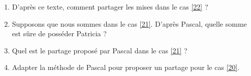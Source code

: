 \documentclass{article}
\begin{document}
\begin{enumerate}[label=\textbf{Question \arabic*}\hfill]
\item D'après ce texte, comment partager les mises dans le cas \ref{22} ?
\item Supposons que nous sommes dans le cas \ref{21}. D'après Pascal, quelle somme est \og sûre \fg de posséder Patricia ?
\item Quel est le partage proposé par Pascal dans le cas \ref{21} ?
\item Adapter la méthode de Pascal pour proposer un partage pour le cas \ref{20}.
\end{enumerate}
\end{document}
